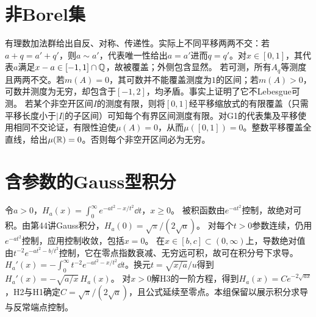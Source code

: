 \documentclass[UTF8,fontset=fandol,11pt]{ctexart}
\begin{document}
\section{非Borel集}
有理数加法群给出自反、对称、传递性。实际上不同平移两两不交：若$a+q=a'+q'$，则$a\sim a'$，代表唯一性给出$a=a'$进而$q=q'$。对$x\in[0,1]$，其代表$a$满足$x-a\in[-1,1]\cap\mathbb Q$，故被覆盖；外侧包含显然。
若可测，所有$A_q$等测度且两两不交。若$m(A)=0$，其可数并不能覆盖测度为$1$的区间；若$m(A)>0$，可数并测度为无穷，却包含于$[-1,2]$，均矛盾。事实上证明了它不Lebesgue可测。
若某个非空开区间$I$的测度有限，则将$[0,1]$经平移缩放式的有限覆盖（只需平移长度小于$|I|$的子区间）可知每个有界区间测度有限。对G1的代表集及平移使用相同不交论证，有限性迫使$\mu(A)=0$，从而$\mu([0,1])=0$。整数平移覆盖全直线，给出$\mu(\mathbb R)=0$。否则每个非空开区间必为无穷。
\section{含参数的Gauss型积分}
令$a>0$，$H_a(x)=\int_0^\infty e^{-at^2-x/t^2}\dd t$，$x\ge0$。
被积函数由$e^{-at^2}$控制，故绝对可积。由第44讲Gauss积分，$H_a(0)=\sqrt\pi/(2\sqrt a)$。
\problem{H2（连续性）}{证明$H_a:[0,\infty)\to\R$连续。}
对每个$t>0$参数连续，仍用$e^{-at^2}$控制，应用控制收敛，包括$x=0$。
在$x\in[b,c]\subset(0,\infty)$上，导数绝对值由$t^{-2}e^{-at^2-b/t^2}$控制，它在零点指数衰减、无穷远可积，故可在积分号下求导。
$H_a'(x)=-\int_0^\infty t^{-2}e^{-at^2-x/t^2}\dd t$。换元$t=\sqrt{x/a}/u$得到$H_a'(x)=-\sqrt{a/x}\,H_a(x)$。
对$x>0$解H3的一阶方程，得到$H_a(x)=Ce^{-2\sqrt{ax}}$，H2与H1确定$C=\sqrt\pi/(2\sqrt a)$，且公式延续至零点。本组保留以展示积分求导与反常端点控制。
\end{document}
